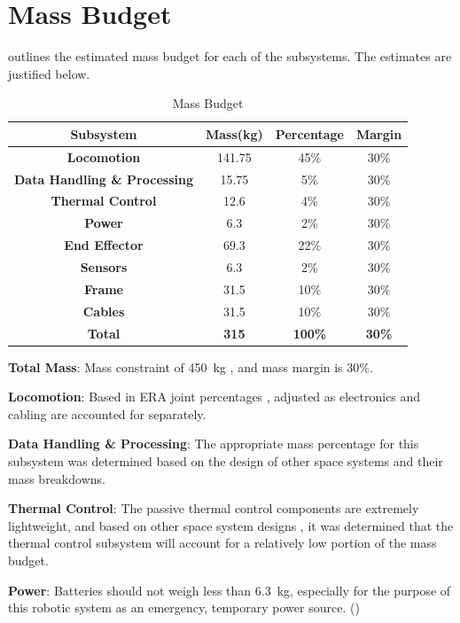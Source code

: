 \documentclass[12pt, letterpaper]{article}
\begin{document}
\section{Mass Budget}
\label{sect:mass}
 outlines the estimated mass budget for each of the subsystems. The estimates are justified below.

\begin{table}[H]
\centering
\caption{Mass Budget}
\begin{tabular}{cccc}
\toprule
\textbf{Subsystem}	&	\textbf{Mass(kg)}	&	\textbf{Percentage}	&	\textbf{Margin}\\\midrule
\textbf{Locomotion}						&	141.75	&	45\%&	30\%\\
\textbf{Data Handling \& Processing}	&	15.75	&	5\%	&	30\%\\
\textbf{Thermal Control}				&	12.6	&	4\%	&	30\%\\
\textbf{Power}							&	6.3		&	2\%	&	30\%\\
\textbf{End Effector}					&	69.3	&	22\%&	30\%\\
\textbf{Sensors}						&	6.3		&	2\%	&	30\%\\
\textbf{Frame}							&	31.5	&	10\%&	30\%\\
\textbf{Cables}							&	31.5	&	10\%&	30\%\\\hline
\textbf{Total}	&	\textbf{315}	&	\textbf{100\%}	&	\textbf{30\%}	\\\bottomrule
\end{tabular}
\label{table:mass}
\end{table}

\textbf{Total Mass}: Mass constraint of \SI{450}{\kilo\gram} \cite{RFP}, and mass margin is 30\%.

\textbf{Locomotion}: Based in ERA joint percentages \cite{ERA_joints}, adjusted as electronics and cabling are accounted for separately. 

\textbf{Data Handling \& Processing}: The appropriate mass percentage for this subsystem was determined based on the design of other space systems and their mass breakdowns. \cite{LISA_budget, TUD_mass, NASA_microrover}

\textbf{Thermal Control}: The passive thermal control components are extremely lightweight, and based on other space system designs \cite{TUD_mass}, it was determined that the thermal control subsystem will account for a relatively low portion of the mass budget.

\textbf{Power}: Batteries should not weigh less than \SI{6.3}{\kilo\gram}, especially for the purpose of this robotic system as an emergency, temporary power source. ()
\end{document}
